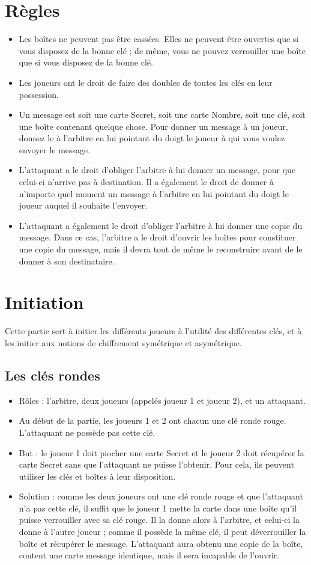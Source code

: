 \documentclass[a4paper,10pt]{article}
\begin{document}
\section{Règles}
\begin{itemize}
\item Les boîtes ne peuvent pas être cassées. Elles ne peuvent être ouvertes que si vous disposez de la bonne clé ; de même, vous ne pouvez verrouiller une boîte que si vous disposez de la bonne clé.
\item Les joueurs ont le droit de faire des doubles de toutes les clés en leur possession.
\item Un message est soit une carte Secret, soit une carte Nombre, soit une clé, soit une boîte contenant quelque chose. Pour donner un message à un joueur, donnez le à l'arbitre en lui pointant du doigt le joueur à qui vous voulez envoyer le message.
\item L'attaquant a le droit d'obliger l'arbitre à lui donner un message, pour que celui-ci n'arrive pas à destination. Il a également le droit de donner à n'importe quel moment un message à l'arbitre en lui pointant du doigt le joueur auquel il souhaite l'envoyer. 
\item L'attaquant a également le droit d'obliger l'arbitre à lui donner une copie du message. Dans ce cas, l'arbitre a le droit d'ouvrir les boîtes pour constituer une copie du message, mais il devra tout de même le reconstruire avant de le donner à son destinataire.
\end{itemize}


\section{Initiation}
Cette partie sert à initier les différents joueurs à l'utilité des différentes clés, et à les initier aux notions de chiffrement symétrique et asymétrique.
\subsection{Les clés rondes}
\begin{itemize}
	\item Rôles : l'arbitre, deux joueurs (appelés joueur 1 et joueur 2), et un attaquant.
	\item Au début de la partie, les joueurs 1 et 2 ont chacun une clé ronde rouge. L'attaquant ne possède pas cette clé.
	\item But : le joueur 1 doit piocher une carte Secret et le joueur 2 doit récupérer la carte Secret sans que l'attaquant ne puisse l'obtenir. Pour cela, ils peuvent utiliser les clés et boîtes à leur disposition.
	\item Solution : comme les deux joueurs ont une clé ronde rouge et que l'attaquant n'a pas cette clé, il suffit que le joueur 1 mette la carte dans une boîte qu'il puisse verrouiller avec sa clé rouge. Il la donne alors à l'arbitre, et celui-ci la donne à l'autre joueur ; comme il possède la même clé, il peut déverrouiller la boîte et récupérer le message. L'attaquant aura obtenu une copie de la boîte, content une carte message identique, mais il sera incapable de l'ouvrir.
\end{itemize}
\end{document}

